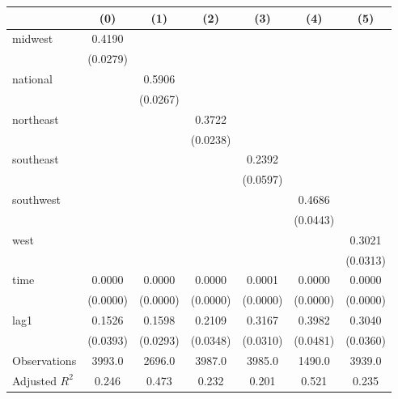 \begin{tabular}{lcccccc}
\toprule
 & (0) & (1) & (2) & (3) & (4) & (5) \\
\midrule
midwest & 0.4190 &  &  &  &  &  \\
\vspace{0.2cm}
 & (0.0279) &  &  &  &  &  \\
national &  & 0.5906 &  &  &  &  \\
\vspace{0.2cm}
 &  & (0.0267) &  &  &  &  \\
northeast &  &  & 0.3722 &  &  &  \\
\vspace{0.2cm}
 &  &  & (0.0238) &  &  &  \\
southeast &  &  &  & 0.2392 &  &  \\
\vspace{0.2cm}
 &  &  &  & (0.0597) &  &  \\
southwest &  &  &  &  & 0.4686 &  \\
\vspace{0.2cm}
 &  &  &  &  & (0.0443) &  \\
west &  &  &  &  &  & 0.3021 \\
\vspace{0.2cm}
 &  &  &  &  &  & (0.0313) \\
time & 0.0000 & 0.0000 & 0.0000 & 0.0001 & 0.0000 & 0.0000 \\
\vspace{0.2cm}
 & (0.0000) & (0.0000) & (0.0000) & (0.0000) & (0.0000) & (0.0000) \\
lag1 & 0.1526 & 0.1598 & 0.2109 & 0.3167 & 0.3982 & 0.3040 \\
\vspace{0.2cm}
 & (0.0393) & (0.0293) & (0.0348) & (0.0310) & (0.0481) & (0.0360) \\
\midrule
Observations & 3993.0 & 2696.0 & 3987.0 & 3985.0 & 1490.0 & 3939.0 \\
Adjusted $R^2$ & 0.246 & 0.473 & 0.232 & 0.201 & 0.521 & 0.235 \\
\bottomrule
\end{tabular}